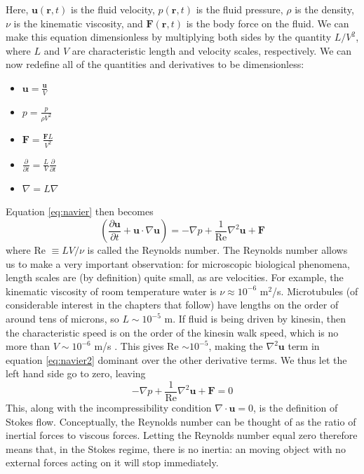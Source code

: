 \documentclass[11pt]{ucthesis}
\begin{document}
Here, $\mathbf{u}(\mathbf{r},t)$ is the fluid velocity, $p(\mathbf{r},t)$ is the fluid pressure, $\rho$ is the density, $\nu$ is the kinematic viscosity, and $\mathbf{F}(\mathbf{r},t)$ is the body force on the fluid. We can make this equation dimensionless by multiplying both sides by the quantity $L/V^2$, where $L$ and $V$ are characteristic length and velocity scales, respectively. We can now redefine all of the quantities and derivatives to be dimensionless:
\begin{itemize}
\item $\mathbf{u} = \frac{\mathbf{u}}{V}$
\item $p = \frac{p}{\rho V^2}$
\item $\mathbf{F} = \frac{\mathbf{F}L}{V^2}$
\item $\frac{\partial}{\partial t} = \frac{L}{V}\frac{\partial}{\partial t}$
\item $\nabla = L\nabla$
\end{itemize} 
Equation \ref{eq:navier} then becomes 
\begin{equation}
\label{eq:navier2}
\left(\frac{\partial \mathbf{u}}{\partial t} + \mathbf{u}\cdot\nabla\mathbf{u}\right) = -\nabla p + \frac{1}{\text{Re}}\nabla^2\mathbf{u} + \mathbf{F}
\end{equation}
where Re $\equiv LV/\nu$ is called the Reynolds number. The Reynolds number allows us to make a very important observation: for microscopic biological phenomena, length scales are (by definition) quite small, as are velocities. For example, the kinematic viscosity of room temperature water is $\nu\approx 10^{-6}$ m$^2$/s. Microtubules (of considerable interest in the chapters that follow) have lengths on the order of around tens of microns, so $L\sim10^{-5}$ m. If fluid is being driven by kinesin, then the characteristic speed is on the order of the kinesin walk speed, which is no more than $V\sim10^{-6}$ m/s \cite{vale1985identification,vale1996direct}. This gives Re $\sim10^{-5}$, making the $\nabla^2\mathbf{u}$ term in equation \ref{eq:navier2} dominant over the other derivative terms. We thus let the left hand side go to zero, leaving
\begin{equation}
\label{eq:lowRe}
-\nabla p + \frac{1}{\text{Re}}\nabla^2\mathbf{u} + \mathbf{F} = 0
\end{equation} 
This, along with the incompressibility condition $\nabla \cdot \mathbf u = 0$, is the definition of Stokes flow. Conceptually, the Reynolds number can be thought of as the ratio of inertial forces to viscous forces. Letting the Reynolds number equal zero therefore means that, in the Stokes regime, there is no inertia: an moving object with no external forces acting on it will stop immediately.
\end{document}
